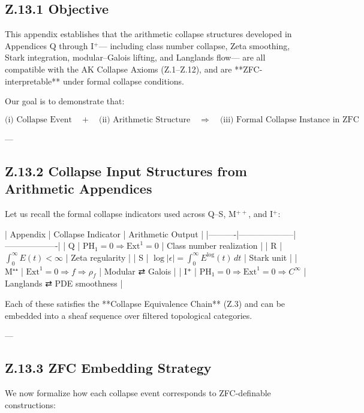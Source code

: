 \documentclass[11pt]{article}
\begin{document}
\begin{axiom}
\begin{axiom}
{{\subsection*{Z.13.1 Objective}

This appendix establishes that the arithmetic collapse structures developed in Appendices Q through I$^+$—  
including class number collapse, Zeta smoothing, Stark integration, modular–Galois lifting, and Langlands flow—  
are all compatible with the AK Collapse Axioms (Z.1–Z.12), and are **ZFC-interpretable** under formal collapse conditions.

Our goal is to demonstrate that:

\[
\text{(i) Collapse Event} \quad + \quad \text{(ii) Arithmetic Structure} 
\quad \Rightarrow \quad \text{(iii) Formal Collapse Instance in ZFC}
\]

---

\subsection*{Z.13.2 Collapse Input Structures from Arithmetic Appendices}

Let us recall the formal collapse indicators used across Q–S, M$^{++}$, and I$^+$:

| Appendix | Collapse Indicator | Arithmetic Output |
|----------|--------------------|-------------------|
| Q        | \( \mathrm{PH}_1 = 0 \Rightarrow \mathrm{Ext}^1 = 0 \) | Class number realization |
| R        | \( \int_0^\infty E(t) < \infty \) | Zeta regularity |
| S        | \( \log |\epsilon| = \int_0^\infty E^\log(t)\,dt \) | Stark unit |
| M⁺⁺      | \( \mathrm{Ext}^1 = 0 \Rightarrow f \Rightarrow \rho_f \) | Modular ⇄ Galois |
| I⁺       | \( \mathrm{PH}_1 = 0 \Rightarrow \mathrm{Ext}^1 = 0 \Rightarrow C^\infty \) | Langlands ⇄ PDE smoothness |

Each of these satisfies the **Collapse Equivalence Chain** (Z.3) and can be embedded into a sheaf sequence over filtered topological categories.

---

\subsection*{Z.13.3 ZFC Embedding Strategy}

We now formalize how each collapse event corresponds to ZFC-definable constructions:

}}
\end{axiom}
\end{axiom}
\end{document}
